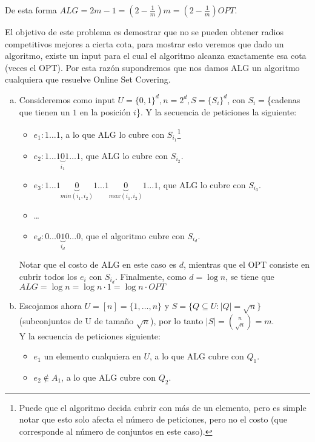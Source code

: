 \documentclass[dcc,uchile]{fcfmcourse}
\begin{document}
\begin{problems}
\begin{enumerate}[a)]
    De esta forma $ALG = 2m-1 = \left(2-\frac{1}{m}\right)m = \left(2-\frac{1}{m}\right)OPT$.
\end{enumerate}
\newpage
\item El objetivo de este problema es demostrar que no se pueden obtener radios competitivos mejores a cierta cota, para mostrar esto veremos que dado un algoritmo, existe un input para el cual el algoritmo alcanza exactamente esa cota (veces el OPT). Por esta razón supondremos que nos damos ALG un algoritmo cualquiera que resuelve Online Set Covering.
\begin{enumerate}[a)]
    \item Consideremos como input $U=\{0,1\}^d, n = 2^d, S=\{S_{i}\}^d$, con $S_{i}=$\{cadenas que tienen un $1$ en la posición $i$\}. Y la secuencia de peticiones la siguiente:
    \begin{itemize}
        \item $e_{1}: 1\ldots 1$, a lo que ALG lo cubre con $S_{i_{1}}$\footnote{Puede que el algoritmo decida cubrir con más de un elemento, pero es simple notar que esto solo afecta el número de peticiones, pero no el costo (que corresponde al número de conjuntos en este caso).}
        \item $e_{2}: 1\ldots 1 \underbrace{0}_{i_{1}} 1 \ldots 1$, que ALG lo cubre con $S_{i_{2}}$.
        \item $e_{3}: 1\ldots 1 \underbrace{0}_{min(i_{1},i_{2})} 1 \ldots 1 \underbrace{0}_{max(i_{1},i_{2})} 1 \ldots 1 $, que ALG lo cubre con $S_{i_{3}}$.
        \item \ldots
        \item $e_{d}: 0\ldots 0 \underbrace{1}_{i_{d}} 0 \ldots 0$, que el algoritmo cubre con $S_{i_{d}}$.
    \end{itemize}
    Notar que el costo de ALG en este caso es $d$, mientras que el OPT consiste en cubrir todos los $e_{i}$ con $S_{i_{d}}$. Finalmente, como $d = \log n$, se tiene que $ALG = \log n  =    \log n\cdot 1 = \log n \cdot OPT$
    \item Escojamos ahora $U = [n] = \{1, \ldots, n\}$ y $S =\{Q\subseteq U \colon |Q| = \sqrt{n}\}$ (subconjuntos de U de tamaño $\sqrt{n}$), por lo tanto $|S| = \binom{n}{\sqrt{n}} = m$.\\
    Y la secuencia de peticiones siguiente:
    \begin{itemize}
        \item $e_{1}$ un elemento cualquiera en $U$, a lo que ALG cubre con $Q_{1}$.
        \item $e_{2} \not \in A_{1}$, a lo que ALG cubre con $Q_{2}$.

\end{itemize}
\end{enumerate}
\end{problems}
\end{document}

